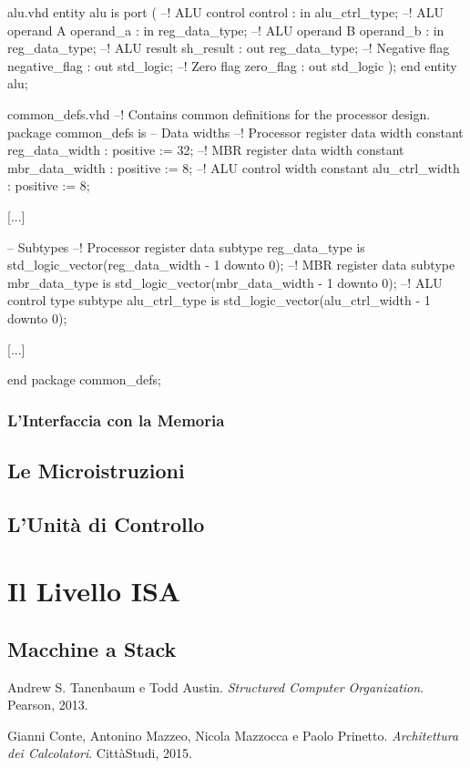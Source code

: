 \documentclass[a4paper,12pt]{scrreprt}
\begin{document}
\begin{myvhdl}{alu.vhd}
 entity alu is
  port (
    --! ALU control
    control       : in  alu_ctrl_type;
    --! ALU operand A
    operand_a     : in  reg_data_type;
    --! ALU operand B
    operand_b     : in  reg_data_type;
    --! ALU result
    sh_result     : out reg_data_type;
    --! Negative flag
    negative_flag : out std_logic;
    --! Zero flag
    zero_flag     : out std_logic
    );
end entity alu;
\end{myvhdl}

\begin{myvhdl}{common\_defs.vhd}
--! Contains common definitions for the processor design.
package common_defs is
  -- Data widths
  --! Processor register data width
  constant reg_data_width      : positive := 32;
  --! MBR register data width
  constant mbr_data_width      : positive := 8;
  --! ALU control width
  constant alu_ctrl_width      : positive := 8;

  [...]

  -- Subtypes
  --! Processor register data
  subtype reg_data_type is std_logic_vector(reg_data_width - 1 downto 0);
  --! MBR register data
  subtype mbr_data_type is std_logic_vector(mbr_data_width - 1 downto 0);
  --! ALU control type
  subtype alu_ctrl_type is std_logic_vector(alu_ctrl_width - 1 downto 0);

  [...]

end package common_defs;
\end{myvhdl}

\subsection{L'Interfaccia con la Memoria}

\section{Le Microistruzioni}

\section{L'Unità di Controllo}

\chapter{Il Livello ISA}

\section{Macchine a Stack}

\begin{thebibliography}{2}
  Andrew S. Tanenbaum e Todd Austin.
  \textit{Structured Computer Organization}.
  Pearson, 2013.

  Gianni Conte, Antonino Mazzeo, Nicola Mazzocca e Paolo Prinetto.
  \textit{Architettura dei Calcolatori}.
  CittàStudi, 2015.
\end{thebibliography}
\end{document}
